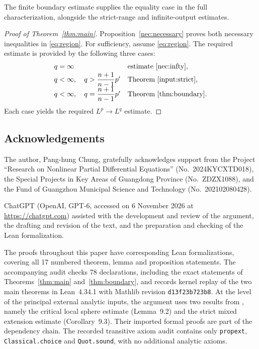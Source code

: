 \documentclass[11pt]{article}
\numberwithin{equation}{section}
\begin{document}
The finite boundary estimate supplies the equality case in the full
characterization, alongside the strict-range and infinite-output estimates.

\begin{proof}[Proof of Theorem~\ref{thm:main}]
Proposition~\ref{nec:necessary} proves both necessary inequalities
in \eqref{eq:region}. For sufficiency, assume \eqref{eq:region}.
The required estimate is provided by the following three cases:
\[
 \begin{array}{ll}
 q=\infty
 &\text{estimate }\eqref{nec:infty},\\[2pt]
 q<\infty,\quad q>\dfrac{n+1}{n-1}p'
 &\text{Theorem~\ref{input:strict}},\\[4pt]
 q<\infty,\quad q=\dfrac{n+1}{n-1}p'
 &\text{Theorem~\ref{thm:boundary}}.
 \end{array}
\]
Each case yields the required \(L^p\to L^q\) estimate.
\end{proof}


\subsection*{Acknowledgements}

The author, Pang-hung Chung, gratefully acknowledges support from
the Project ``Research on Nonlinear Partial Differential Equations''
(No.~2024KYCXTD018), the Special Projects in Key Areas of Guangdong
Province (No.~ZDZX1088), and the Fund of Guangzhou Municipal Science
and Technology (No.~202102080428).

ChatGPT (OpenAI, GPT-6, accessed on 6 November 2026 at
\url{https://chatgpt.com}) assisted with the development and review of
the argument, the drafting and revision of the text, and the preparation
and checking of the Lean formalization.


The proofs throughout this paper have corresponding Lean formalizations,
covering all 17 numbered theorem, lemma and proposition statements.
The accompanying audit checks 78 declarations, including the exact
statements of Theorems~\ref{thm:main} and~\ref{thm:boundary}, and records
kernel replay of the two main theorems in Lean~4.34.1 with Mathlib
revision \texttt{d13f23b723b8}.
At the level of the principal external analytic inputs, the argument uses
two results from \cite{openai-local-smoothing}, namely the critical local
sphere estimate (Lemma~9.2) and the strict mixed extension estimate
(Corollary~9.3). Their imported formal proofs are part of the dependency
chain. The recorded transitive axiom audit contains only
\texttt{propext}, \texttt{Classical.choice} and \texttt{Quot.sound},
with no additional analytic axioms.
\end{document}
